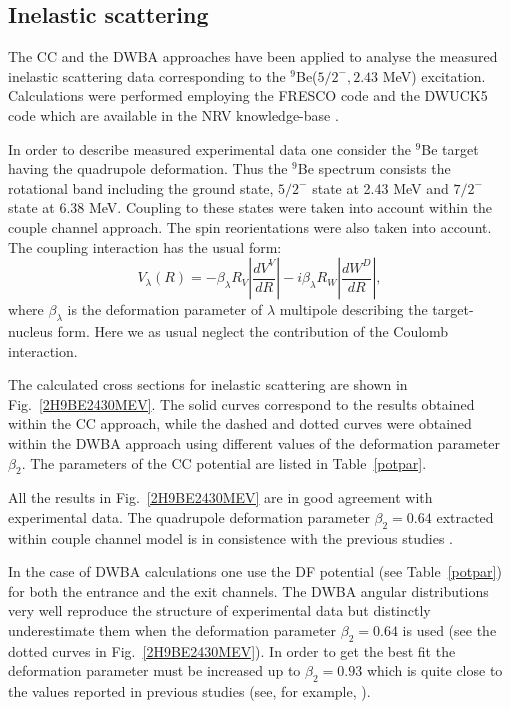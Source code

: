 \documentclass[10pt]{iopart}
\begin{document}
\subsection{Inelastic scattering}
The CC and the DWBA approaches have been applied to analyse the measured inelastic scattering data corresponding to the ${}^9$Be($5/2^-, 2.43$ MeV) excitation. Calculations were performed employing the FRESCO code \cite{fresco} and the DWUCK5 code \cite{kunz} which are available in the NRV knowledge-base \cite{nrv}.

In order to describe measured experimental data one consider the ${}^9$Be target having the quadrupole deformation. Thus the ${}^9$Be spectrum consists the rotational band including the ground state, $5/2^-$ state at 2.43 MeV and $7/2^-$ state at 6.38 MeV. Coupling to these states were taken into account within the couple channel approach. The spin reorientations were also taken into account. The coupling interaction has the usual form:
\begin{equation}
V_\lambda(R)=-\beta_\lambda R_V \left|\frac{d V^V}{dR}\right| - i \beta_\lambda R_W \left|\frac{d W^D}{dR}\right|,
\end{equation}
where $\beta_\lambda$ is the deformation parameter of $\lambda$ multipole describing the target-nucleus form. Here we as usual neglect the contribution of the Coulomb interaction.

The calculated cross sections for inelastic scattering are shown in Fig.~\ref{2H9BE2430MEV}. The solid curves correspond to the results obtained within the CC approach, while the dashed and dotted curves were obtained within the DWBA approach using  different values of the deformation parameter $\beta_2$. The parameters of the CC potential are listed in Table~\ref{potpar}.

All the results in Fig.~\ref{2H9BE2430MEV} are in good agreement with experimental data. The quadrupole deformation parameter $\beta_2 = 0.64$ extracted within couple channel model is in consistence with the previous studies \cite{lukyanov2014, harakeh1980}.

In the case of DWBA calculations one use the DF potential (see Table~\ref{potpar}) for both the entrance and the exit channels. The DWBA angular distributions very well reproduce the structure of experimental data but distinctly underestimate them when the deformation parameter $\beta_2 = 0.64$ is used (see the dotted curves in Fig.~\ref{2H9BE2430MEV}). In order to get the best fit the deformation parameter must be increased up to $\beta_2 = 0.93$ which is quite close to the values reported in previous studies (see, for example, \cite{bodek1989, votava1973}).
\end{document}
